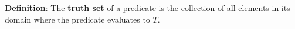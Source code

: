 
{\bf Definition}: The {\bf truth  set} of a  predicate is the collection of all elements in its
domain where the predicate evaluates to $T$.